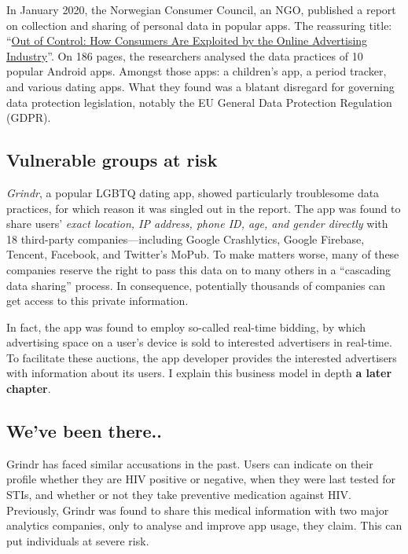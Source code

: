 \documentclass[
]{book}
\begin{document}
In January 2020, the Norwegian Consumer Council, an NGO, published a report on collection and sharing of personal data in popular apps. The reassuring title: ``\href{https://fil.forbrukerradet.no/wp-content/uploads/2020/01/2020-01-14-out-of-control-final-version.pdf}{Out of Control: How Consumers Are Exploited by the Online Advertising Industry}''. On 186 pages, the researchers analysed the data practices of 10 popular Android apps. Amongst those apps: a children's app, a period tracker, and various dating apps. What they found was a blatant disregard for governing data protection legislation, notably the EU General Data Protection Regulation (GDPR).

\hypertarget{vulnerable-groups-at-risk}{%
\subsection{Vulnerable groups at risk}\label{vulnerable-groups-at-risk}}

\emph{Grindr}, a popular LGBTQ dating app, showed particularly troublesome data practices, for which reason it was singled out in the report. The app was found to share users' \emph{exact location, IP address, phone ID, age, and gender directly} with 18 third-party companies---including Google Crashlytics, Google Firebase, Tencent, Facebook, and Twitter's MoPub. To make matters worse, many of these companies reserve the right to pass this data on to many others in a ``cascading data sharing'' process. In consequence, potentially thousands of companies can get access to this private information.

In fact, the app was found to employ so-called real-time bidding, by which advertising space on a user's device is sold to interested advertisers in real-time. To facilitate these auctions, the app developer provides the interested advertisers with information about its users. I explain this business model in depth \textbf{a later chapter}.

\hypertarget{weve-been-there..}{%
\subsection{We've been there..}\label{weve-been-there..}}

Grindr has faced similar accusations in the past. Users can indicate on their profile whether they are HIV positive or negative, when they were last tested for STIs, and whether or not they take preventive medication against HIV. Previously, Grindr was found to share this medical information with two major analytics companies, only to analyse and improve app usage, they claim. This can put individuals at severe risk.
\end{document}
